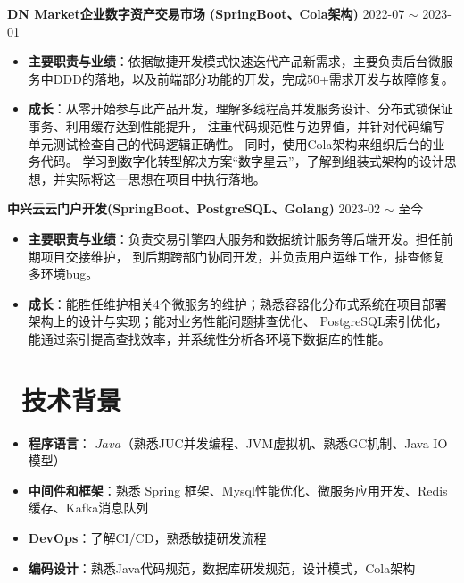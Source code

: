 \documentclass[10pt, a4paper]{article}
\begin{document}
\textbf{DN Market企业数字资产交易市场 (SpringBoot、Cola架构)} \hfill 2022-07 $\sim$ 2023-01

\begin{itemize}[parsep=0.5ex]
\item \textbf{主要职责与业绩}：依据敏捷开发模式快速迭代产品新需求，主要负责后台微服务中DDD的落地，以及前端部分功能的开发，完成50+需求开发与故障修复。

\item \textbf{成长}：从零开始参与此产品开发，理解多线程高并发服务设计、分布式锁保证事务、利用缓存达到性能提升，
注重代码规范性与边界值，并针对代码编写单元测试检查自己的代码逻辑正确性。 同时，使用Cola架构来组织后台的业务代码。
学习到数字化转型解决方案“数字星云”，了解到组装式架构的设计思想，并实际将这一思想在项目中执行落地。 %
\end{itemize}

\textbf{中兴云云门户开发(SpringBoot、PostgreSQL、Golang)} \hfill 2023-02 $\sim$ 至今

\begin{itemize}[parsep=0.5ex]
\item \textbf{主要职责与业绩}：负责交易引擎四大服务和数据统计服务等后端开发。担任前期项目交接维护，
到后期跨部门协同开发，并负责用户运维工作，排查修复多环境bug。
\item \textbf{成长}：能胜任维护相关4个微服务的维护；熟悉容器化分布式系统在项目部署架构上的设计与实现；能对业务性能问题排查优化、
PostgreSQL索引优化，能通过索引提高查找效率，并系统性分析各环境下数据库的性能。
\end{itemize}




\section{\color{CVBlue}\faCogs\ 技术背景}
\begin{itemize}[parsep=0.5ex]
  \item \textbf{程序语言}： $Java$（熟悉JUC并发编程、JVM虚拟机、熟悉GC机制、Java IO模型）
  \item \textbf{中间件和框架}：熟悉 Spring 框架、Mysql性能优化、微服务应用开发、Redis缓存、Kafka消息队列
  \item \textbf{DevOps}：了解CI/CD，熟悉敏捷研发流程
  \item \textbf{编码设计}：熟悉Java代码规范，数据库研发规范，设计模式，Cola架构
\end{itemize}
\end{document}
